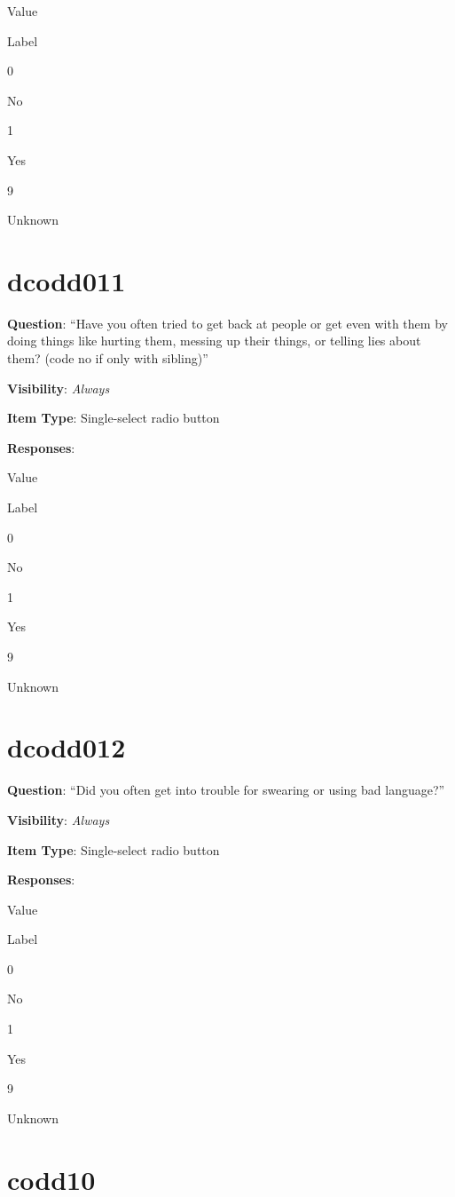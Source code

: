 \documentclass[]{book}
\begin{document}
Value

Label

0

No

1

Yes

9

Unknown

\hypertarget{dcodd011}{%
\section{dcodd011}\label{dcodd011}}

\textbf{Question}: ``Have you often tried to get back at people or get even with them by doing things like hurting them, messing up their things, or telling lies about them? (code no if only with sibling)''

\textbf{Visibility}: \emph{Always}

\textbf{Item Type}: Single-select radio button

\textbf{Responses}:

Value

Label

0

No

1

Yes

9

Unknown

\hypertarget{dcodd012}{%
\section{dcodd012}\label{dcodd012}}

\textbf{Question}: ``Did you often get into trouble for swearing or using bad language?''

\textbf{Visibility}: \emph{Always}

\textbf{Item Type}: Single-select radio button

\textbf{Responses}:

Value

Label

0

No

1

Yes

9

Unknown

\hypertarget{codd10}{%
\section{codd10}\label{codd10}}
\end{document}
